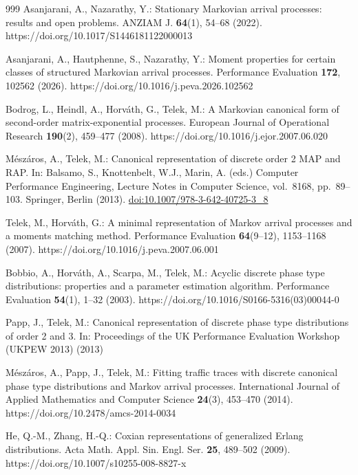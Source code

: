 \begin{thebibliography}{999}
Asanjarani, A., Nazarathy, Y.: Stationary Markovian arrival processes: results and open problems. ANZIAM J. \textbf{64}(1), 54--68 (2022). https://doi.org/10.1017/S1446181122000013

Asanjarani, A., Hautphenne, S., Nazarathy, Y.: Moment properties for certain
classes of structured Markovian arrival processes. Performance Evaluation
\textbf{172}, 102562 (2026). https://doi.org/10.1016/j.peva.2026.102562

Bodrog, L., Heindl, A., Horv\'ath, G., Telek, M.: A Markovian canonical form of second-order matrix-exponential processes. European Journal of Operational Research \textbf{190}(2), 459--477 (2008). https://doi.org/10.1016/j.ejor.2007.06.020

M\'esz\'aros, A., Telek, M.: Canonical representation of discrete order 2 MAP and RAP. In: Balsamo, S., Knottenbelt, W.J., Marin, A. (eds.) Computer Performance Engineering, Lecture Notes in Computer Science, vol.~8168, pp.~89--103. Springer, Berlin (2013). \href{https://doi.org/10.1007/978-3-642-40725-3_8}{doi:10.1007/978-3-642-40725-3\_8}

Telek, M., Horv\'ath, G.: A minimal representation of Markov arrival processes and a moments matching method. Performance Evaluation \textbf{64}(9--12), 1153--1168 (2007). https://doi.org/10.1016/j.peva.2007.06.001

Bobbio, A., Horv\'ath, A., Scarpa, M., Telek, M.: Acyclic discrete phase type distributions: properties and a parameter estimation algorithm. Performance Evaluation \textbf{54}(1), 1--32 (2003). https://doi.org/10.1016/S0166-5316(03)00044-0

Papp, J., Telek, M.: Canonical representation of discrete phase type distributions of order 2 and 3. In: Proceedings of the UK Performance Evaluation Workshop (UKPEW 2013) (2013)

M\'esz\'aros, A., Papp, J., Telek, M.: Fitting traffic traces with discrete canonical phase type distributions and Markov arrival processes. International Journal of Applied Mathematics and Computer Science \textbf{24}(3), 453--470 (2014). https://doi.org/10.2478/amcs-2014-0034

He, Q.-M., Zhang, H.-Q.: Coxian representations of generalized Erlang
distributions. Acta Math. Appl. Sin. Engl. Ser. \textbf{25}, 489--502 (2009).
https://doi.org/10.1007/s10255-008-8827-x


\end{thebibliography}
